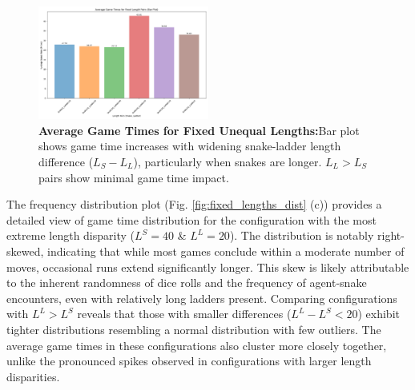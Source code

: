 \begin{figure}[th]
	\centering
	\includegraphics[width=0.5\textwidth]{"../Chapter 2/withLength/UnequalLengths/approach_1_fixed_length_pairs_barplot"}
	\caption{\textbf{Average Game Times for Fixed Unequal Lengths:}Bar plot shows game time increases with widening snake-ladder length difference ($L_S - L_L$), particularly when snakes are longer. $L_L > L_S$pairs show minimal game time impact.}
	\label{fig:approach1fixedlengthpairsbarplot}
\end{figure}

The frequency distribution plot (Fig. \ref{fig:fixed_lengths_dist} (c)) provides a detailed view of game time distribution for the configuration with the most extreme length disparity ($L^S = 40$ \& $L^L = 20$). The distribution is notably right-skewed, indicating that while most games conclude within a moderate number of moves, occasional runs extend significantly longer. This skew is likely attributable to the inherent randomness of dice rolls and the frequency of agent-snake encounters, even with relatively long ladders present. Comparing configurations with $L^L > L^S$ reveals that those with smaller differences ($L^L - L^S < 20$) exhibit tighter distributions resembling a normal distribution with few outliers. The average game times in these configurations also cluster more closely together, unlike the pronounced spikes observed in configurations with larger length disparities.

